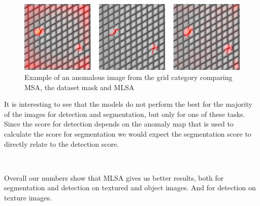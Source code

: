 \begin{figure}[ht!]
\centering
\includegraphics[width=\textwidth]{imgs/samples/grid_broken_anomap.jpg}
\caption{Example of an anomalous image from the grid category comparing MSA, the dataset mask and MLSA}
\label{fig:results:grid-anomap}
\end{figure}

It is interesting to see that the models do not perform the best for the majority of the images for detection and segmentation, but only for one of these tasks. Since the score for detection depends on the anomaly map that is used to calculate the score for segmentation we would expect the segmentation score to directly relate to the detection score.



\

Overall our numbers show that MLSA gives us better results, both for segmentation and detection on textured and object images. And for detection on texture images.

